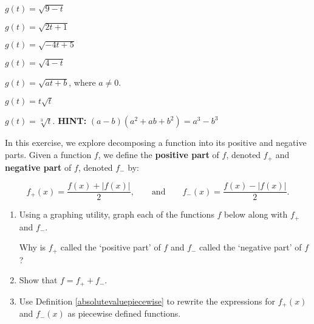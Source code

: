 \begin{exenum}

\item  $g(t) = \sqrt{9-t}$  \label{diffquotexerfirstc}
\item  $g(t) = \sqrt{2t+1}$
\item  $g(t) = \sqrt{-4t+5}$
\item  $g(t) = \sqrt{4-t}$
\item  $g(t) = \sqrt{at+b}$, where $a \neq 0$.
\item  $g(t) = t \sqrt{t}$ 
\item  $g(t) = \sqrt[3]{t}$.  \textbf{HINT:}  $(a-b)\left(a^2+ab+b^2\right) = a^3 - b^3$  \label{diffquotexerlastc}

\item \label{posnegdecompexercise}  In this exercise, we explore decomposing a function into its positive and negative parts.  Given a function $f$, we define the \textbf{positive part} of $f$, denoted $f_{+}$ and \textbf{negative part} of $f$, denoted $f_{-}$ by:

\[ f_{+}(x) = \dfrac{f(x) + |f(x)|}{2}, \qquad \text{and} \qquad f_{-}(x) = \dfrac{f(x) - |f(x)|}{2}. \]

\begin{enumerate}

\item Using a graphing utility, graph each of the functions $f$ below along with $f_{+}$ and $f_{-}$.


Why is $f_{+}$ called the `positive part' of $f$ and $f_{-}$ called the `negative part' of $f$?

\item Show that $f = f_{+} + f_{-}$.

\item Use Definition \ref{absolutevaluepiecewise} to rewrite the expressions for $f_{+}(x)$ and $f_{-}(x)$ as piecewise defined functions.

\end{enumerate}  

\end{exenum}

